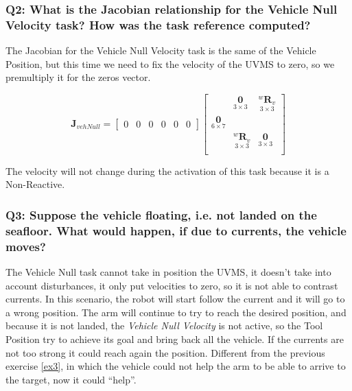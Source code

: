 \documentclass{article}
\newcommand{\ocio} {\marginpar{!}}
\begin{document}
\subsubsection{Q2: What is the Jacobian relationship for the Vehicle Null Velocity task? How was the task reference computed?}
The Jacobian for the Vehicle Null Velocity task is the same of the Vehicle Position, but this time we need to fix the velocity of the UVMS to zero, so we premultiply it for the zeros vector. %

\begin{equation}
\boldsymbol{J}_{vehNull}=\begin{bmatrix} 0 & 0 & 0 & 0 & 0 & 0
\end{bmatrix}
    \begin{bmatrix}
     & \underset{3\times 3}{\boldsymbol{0}} & \underset{ 3\times 3}{^{w}\boldsymbol{R}_{v}} \\
     \underset{6\times 7}{\boldsymbol{0}} \\
     & \underset{ 3\times 3}{^{w}\boldsymbol{R}_{v}} & \underset{3\times 3}{\boldsymbol{0}} \\
    \end{bmatrix}
\end{equation}

The velocity will not change during the activation of this task because it is a Non-Reactive.

\subsubsection{Q3: Suppose the vehicle floating, i.e. not landed on the seafloor. What would happen, if due to currents, the vehicle moves?}
The Vehicle Null task cannot take in position the UVMS, it doesn't take into account disturbances, it only put velocities to zero, so it is not able to contrast currents. In this scenario, the robot will start follow the current and it will go to a wrong position. The arm will continue to try to reach the desired position, and because it is not landed, the \textit{Vehicle Null Velocity} is not active, so the Tool Position try to achieve its goal and bring back all the vehicle. If the currents are not too strong it could reach again the position. Different from the previous exercise \ref{ex3}, in which the vehicle could not help the arm to be able to arrive to the target, now it could ``help''. \ocio
\clearpage
\end{document}
